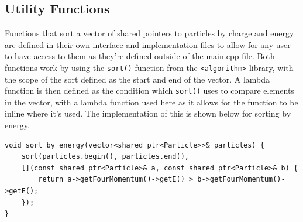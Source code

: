 \documentclass[12pt]{report}
\begin{document}

\subsection{Utility Functions}

Functions that sort a vector of shared pointers to particles by charge and energy are defined in their own interface and implementation files to allow for any user to have access to them as they're defined outside of the main.cpp file. Both functions work by using the \texttt{sort()} function from the \texttt{<algorithm>} library, with the scope of the sort defined as the start and end of the vector. A lambda function is then defined as the condition which \texttt{sort()} uses to compare elements in the vector, with a lambda function used here as it allows for the function to be inline where it's used. The implementation of this is shown below for sorting by energy.
\begin{verbatim}
void sort_by_energy(vector<shared_ptr<Particle>>& particles) {
    sort(particles.begin(), particles.end(),
    [](const shared_ptr<Particle>& a, const shared_ptr<Particle>& b) {
        return a->getFourMomentum()->getE() > b->getFourMomentum()->getE();
    });
}
    
\end{verbatim}
\end{document}
